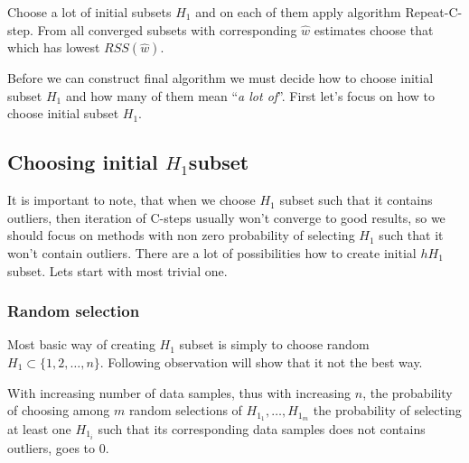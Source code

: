 Choose a lot of initial subsets $H_1$ and on each of them apply algorithm Repeat-C-step. From all converged subsets with corresponding $\hat{w}$ estimates choose that which has lowest $RSS(\hat{w})$. 

Before we can construct final algorithm we must decide how to choose initial subset $H_1$ and how many of them mean ``\emph{a lot of}''. First let's focus on how to choose initial subset $H_1$.


\subsection{Choosing initial $H_1$subset}

It is important to note, that when we choose $H_1$ subset such that it contains outliers, then iteration of  C-steps
usually won't converge to good results, so we should focus on methods with non zero probability of selecting $H_1$ such that it won't contain outliers.
There are a lot of possibilities how to create initial $hH_1$ subset. Lets start with most trivial one.


\subsubsection{Random selection}
Most basic way of creating $H_1$ subset is simply to choose random $H_1 \subset \{{1,2,\ldots , n\}}$. Following observation will show that it not the best way.

\begin{observation}
	With increasing number of data samples, thus with increasing $n$, the probability of choosing among $m$ random selections of $H_{1_1}, \ldots ,H_{1_m}$ the probability of selecting
	at least one $H_{1_i}$ such that its corresponding data samples does not contains outliers, goes to $0$.
\end{observation}


